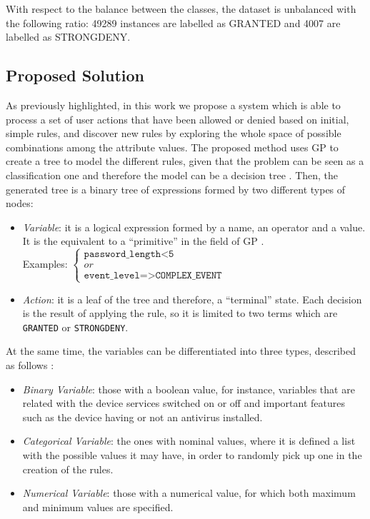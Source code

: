 \documentclass[a4paper,10pt,twocolumn,preprint,3p]{elsarticle}
\begin{document}
With respect to the balance between the classes, the dataset is unbalanced with the following ratio: 49289 instances are labelled as GRANTED and 4007 are labelled as STRONGDENY.

\subsection{Proposed Solution}
\label{subsec:solution}
As previously highlighted, in this work we propose a system which is able to process a set of user actions that have been allowed or denied based on initial, simple rules, and discover new rules by exploring the whole space of possible combinations among the attribute values. The proposed method uses GP to create a tree to model the different rules, given that the problem can be seen as a classification one and therefore the model can be a decision tree \cite{safavian1990survey}. Then, the generated tree is a binary tree of expressions formed by two different types of nodes:

\begin{itemize}
\item {\em Variable}: it is a logical expression formed by a name, an operator and a value. It is the equivalent to a ``primitive'' in the field of GP \cite{back1996evolutionary}.  \\
    Examples:
   \begin{math}
     \left \{
   \begin{array}{l}
     \texttt{password\_length<5} \\
     or \\
      \texttt{event\_level=>COMPLEX\_EVENT}
   \end{array}
   \right .
   \end{math}
\item {\em Action}: it is a leaf of the   tree and therefore, a ``terminal'' state. Each decision is the result of applying the rule, so it is limited to two terms which are \texttt{GRANTED} or \texttt{STRONGDENY}.
\end{itemize}

At the same time, the variables can be differentiated into three types, described as follows \cite{witten2005data}:

\begin{itemize}
\item {\em Binary Variable}: those with a boolean value, for instance, variables that are related with the device services switched on or off and important features such as the device having or not an antivirus installed.
\item {\em Categorical Variable}: the ones with nominal values, where it is defined a list with the possible values it may have, in order to randomly pick up one in the creation of the rules.
\item {\em Numerical Variable}: those with a numerical value, for which both maximum and minimum values are specified.

\end{itemize}
\end{document}
